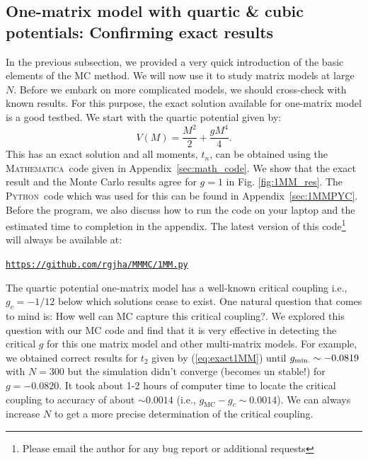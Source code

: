 \documentclass[letter,11pt]{article}
\newcommand{\MA}{\textsc{Mathematica}}
\newcommand{\PY}{\textsc{Python}}
\begin{document}
\subsection{One-matrix model with quartic \& cubic potentials: Confirming exact results} 
In the previous subsection, we provided a very quick introduction of the basic elements of the MC method. We will now use it to study matrix models at large $N$. Before we embark on more complicated models, we should cross-check with known results. For this purpose, the exact solution available for one-matrix model is a good testbed. We start with the quartic potential given by:
\begin{equation}
	V(M) = \frac{M^2}{2} + \frac{gM^4}{4}.  
\end{equation}
This has an exact solution and all moments, $t_{n}$, can be obtained using the \MA~code given in  Appendix~\ref{sec:math_code}. We show that the exact result and the Monte Carlo results agree for $g=1$ in Fig. \ref{fig:1MM_res}. The \PY~code which was used for this can be found in Appendix~\ref{sec:1MMPYC}. Before the program, we also discuss how to run the code on your laptop and the estimated time to completion in the appendix. The latest version of this 
code\footnote{Please email the author for any bug report or additional requests} will always be available at:
\begin{center} \texttt{\href{https://github.com/rgjha/MMMC/1MM.py]}{https://github.com/rgjha/MMMC/1MM.py}} \end{center} 
The quartic potential one-matrix model has a well-known critical coupling i.e., $ g_{c} = -1/12$ below which solutions cease to exist. One natural question that comes to mind is: How well can MC capture this critical coupling?. We explored this question with our MC code and find that it is very effective in detecting the critical $g$ for this one matrix model and other multi-matrix models. 
For example, we obtained correct results for $t_{2}$ given by (\ref{eq:exact1MM}) 
until $g_{\rm{min.}} \sim -0.0819$ with $N=300$ but the simulation didn't converge (becomes un stable!) for $g = -0.0820$. It took about 1-2 hours of computer time to 
locate the critical coupling to accuracy of about $\sim 0.0014$ (i.e., $g_{\text{MC}} - g_{c} \sim 0.0014$). We can always increase $N$ to get a more precise determination of the critical coupling. 
\end{document}
